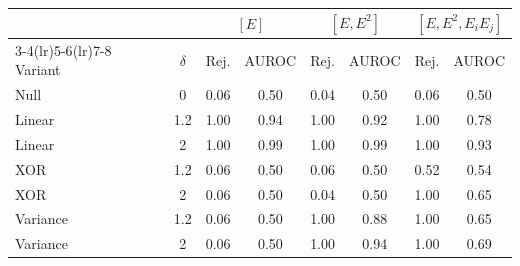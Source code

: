 \begin{tabular}{lccccccc}
\toprule
\multicolumn{2}{c}{} & \multicolumn{2}{c}{$[E]$} & \multicolumn{2}{c}{$[E,E^2]$} & \multicolumn{2}{c}{$[E,E^2,E_iE_j]$} \\
\cmidrule(lr){3-4}\cmidrule(lr){5-6}\cmidrule(lr){7-8}
Variant & $\delta$ & Rej. & AUROC & Rej. & AUROC & Rej. & AUROC \\
\midrule
Null & 0 & 0.06 & 0.50 & 0.04 & 0.50 & 0.06 & 0.50 \\
\midrule
Linear & 1.2 & 1.00 & 0.94 & 1.00 & 0.92 & 1.00 & 0.78 \\
Linear & 2 & 1.00 & 0.99 & 1.00 & 0.99 & 1.00 & 0.93 \\
\midrule
XOR & 1.2 & 0.06 & 0.50 & 0.06 & 0.50 & 0.52 & 0.54 \\
XOR & 2 & 0.06 & 0.50 & 0.04 & 0.50 & 1.00 & 0.65 \\
\midrule
Variance & 1.2 & 0.06 & 0.50 & 1.00 & 0.88 & 1.00 & 0.65 \\
Variance & 2 & 0.06 & 0.50 & 1.00 & 0.94 & 1.00 & 0.69 \\
\bottomrule
\end{tabular}
